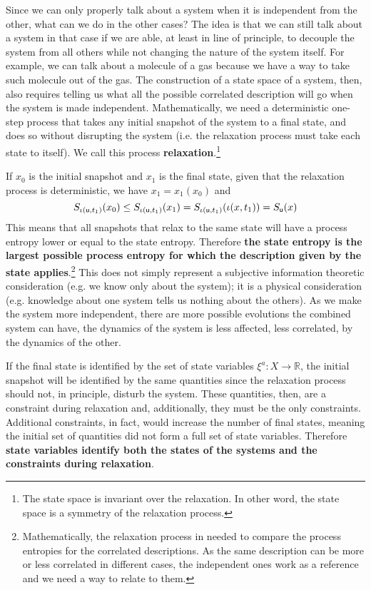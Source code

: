 \documentclass[letterpaper]{article}
\begin{document}
Since we can only properly talk about a system when it is independent from the other, what can we do in the other cases? The idea is that we can still talk about a system in that case if we are able, at least in line of principle, to decouple the system from all others while not changing the nature of the system itself. For example, we can talk about a molecule of a gas because we have a way to take such molecule out of the gas. The construction of a state space of a system, then, also requires telling us what all the possible correlated description will go when the system is made independent. Mathematically, we need a deterministic one-step process that takes any initial snapshot of the system to a final state, and does so without disrupting the system (i.e. the relaxation process must take each state to itself). We call this process \textbf{relaxation}.\footnote{The state space is invariant over the relaxation. In other word, the state space is a symmetry of the relaxation process.}

If $x_0$ is the initial snapshot and $x_1$ is the final state, given that the relaxation process is deterministic, we have $x_1= x_1(x_0)$ and 
\begin{equation}
S_{\iota(\stmt[u], t_1)}(x_0) \leq S_{\iota(\stmt[u], t_1)}(x_1) = S_{\iota(\stmt[u], t_1)}(\iota( x, t_1)) = S_{\stmt[u]}(x)
\end{equation}
This means that all snapshots that relax to the same state will have a process entropy lower or equal to the state entropy. Therefore \textbf{the state entropy is the largest possible process entropy for which the description given by the state applies}.\footnote{Mathematically, the relaxation process in needed to compare the process entropies for the correlated descriptions. As the same description can be more or less correlated in different cases, the independent ones work as a reference and we need a way to relate to them.} This does not simply represent a subjective information theoretic consideration (e.g. we know only about the system); it is a physical consideration (e.g. knowledge about one system tells us nothing about the others). As we make the system more independent, there are more possible evolutions the combined system can have, the dynamics of the system is less affected, less correlated, by the dynamics of the other.

If the final state is identified by the set of state variables $\xi^a : X \to \mathbb{R}$, the initial snapshot will be identified by the same quantities since the relaxation process should not, in principle, disturb the system. These quantities, then, are a constraint during relaxation and, additionally, they must be the only constraints. Additional constraints, in fact, would increase the number of final states, meaning the initial set of quantities did not form a full set of state variables. Therefore \textbf{state variables identify both the states of the systems and the constraints during relaxation}.
\end{document}

